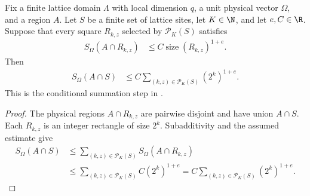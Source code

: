 \begin{lemma}
    \label{thm:area_law_capped_dyadic_entropy_cover_of_forall}
    \leanok
    Fix a finite lattice domain $\Lambda$ with local dimension $q$,
    a unit physical vector $\Omega$, and a region $A$.
    Let $S$ be a finite set of lattice sites, let $K\in\N$, and let
    $e,C\in\R$. Suppose that every square $R_{k,z}$ selected by
    $\mathcal P_K(S)$ satisfies
    \begin{align}
        S_\Omega(A\cap R_{k,z}) & \le C\operatorname{size}(R_{k,z})^{1+e}.
    \end{align}
    Then
    \begin{align}
        S_\Omega(A\cap S)
         & \le C\sum_{(k,z)\in\mathcal P_K(S)}(2^k)^{1+e}.
    \end{align}
    This is the conditional summation step in
    \cite[proof of Lemma~9.4, lines~651--664]{OpenAI2026AreaLaw}.
\end{lemma}
\begin{proof}
    \leanok
    The physical regions $A\cap R_{k,z}$ are pairwise disjoint and
    have union $A\cap S$. Each $R_{k,z}$ is an integer rectangle
    of size $2^k$. Subadditivity and the assumed estimate give
    \begin{align}
        S_\Omega(A\cap S)
         & \le\sum_{(k,z)\in\mathcal P_K(S)}S_\Omega(A\cap R_{k,z}) \\
         & \le\sum_{(k,z)\in\mathcal P_K(S)}C(2^k)^{1+e}
        =C\sum_{(k,z)\in\mathcal P_K(S)}(2^k)^{1+e}.
    \end{align}
\end{proof}


